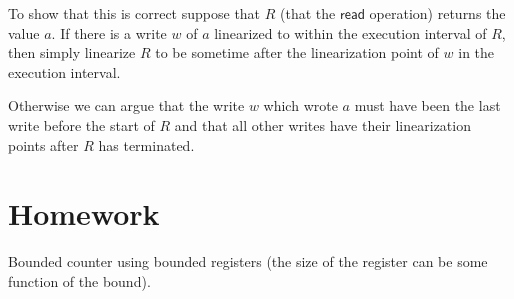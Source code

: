\documentclass[twoside]{article}
\newcommand\READ{\mathsf{read}}
\begin{document}
To show that this is correct suppose that $R$ (that the $\READ$ operation) returns the value $a$. If there is a write $w$ of $a$ linearized to within the execution interval of $R$, then simply linearize $R$ to be sometime after the linearization point of $w$ in the execution interval.

Otherwise we can argue that the write $w$ which wrote $a$ must have been the last write before the start of $R$ and that all other writes have their linearization points after $R$ has terminated.

\section{Homework}
Bounded counter using bounded registers (the size of the register can be some function of the bound).
\end{document}
